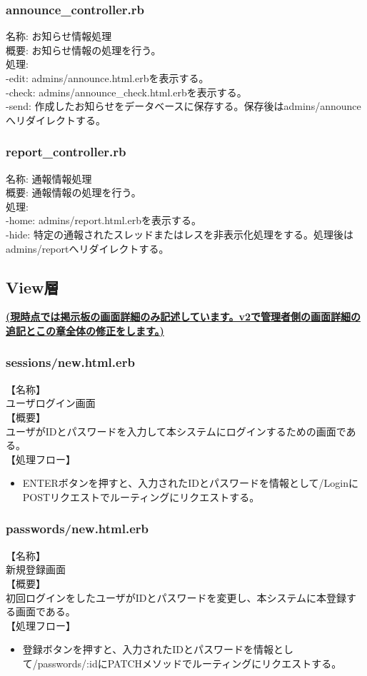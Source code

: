 \documentclass[a4j]{jarticle}
\begin{document}
\subsubsection{announce\_controller.rb}
\noindent 名称: お知らせ情報処理 \\
概要: お知らせ情報の処理を行う。 \\
処理:  \\
-edit: admins/announce.html.erbを表示する。\\
-check: admins/announce\_check.html.erbを表示する。\\
-send: 作成したお知らせをデータベースに保存する。保存後はadmins/announceへリダイレクトする。

\subsubsection{report\_controller.rb}
\noindent 名称: 通報情報処理 \\
概要: 通報情報の処理を行う。 \\
処理:  \\
-home: admins/report.html.erbを表示する。\\
-hide: 特定の通報されたスレッドまたはレスを非表示化処理をする。処理後はadmins/reportへリダイレクトする。

\subsection{View層}
\underline{\bf (現時点では掲示板の画面詳細のみ記述しています。v2で管理者側の画面詳細の追記とこの章全体の修正をします。)}\\
\subsubsection{sessions/new.html.erb}
\noindent
【名称】\\
ユーザログイン画面\\
【概要】\\
ユーザがIDとパスワードを入力して本システムにログインするための画面である。\\
【処理フロー】
\begin{itemize}
  \item ENTERボタンを押すと、入力されたIDとパスワードを情報として/LoginにPOSTリクエストでルーティングにリクエストする。
\end{itemize}


\subsubsection{passwords/new.html.erb}
\noindent
【名称】\\
新規登録画面\\
【概要】\\
初回ログインをしたユーザがIDとパスワードを変更し、本システムに本登録する画面である。\\
【処理フロー】
\begin{itemize}
  \item 登録ボタンを押すと、入力されたIDとパスワードを情報として/passwords/:idにPATCHメソッドでルーティングにリクエストする。
\end{itemize}
\end{document}
